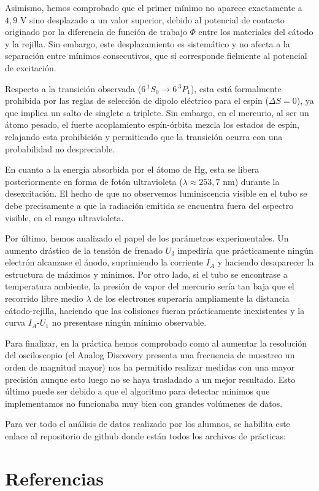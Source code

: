 \documentclass[11pt, a4paper, twocolumn]{article}
\begin{document}
Asimismo, hemos comprobado que el primer mínimo no aparece exactamente a 
$4{,}9$ V sino desplazado a un valor superior, debido al potencial de 
contacto originado por la diferencia de función de trabajo $\Phi$ entre 
los materiales del cátodo y la rejilla. Sin embargo, este desplazamiento 
es sistemático y no afecta a la separación entre mínimos consecutivos, 
que sí corresponde fielmente al potencial de excitación.

Respecto a la transición observada ($6\,^1S_0 \rightarrow 6\,^3P_1$), 
esta está formalmente prohibida por las reglas de selección de dipolo 
eléctrico para el espín ($\Delta S = 0$), ya que implica un salto de 
singlete a triplete. Sin embargo, en el mercurio, al ser un átomo pesado, 
el fuerte acoplamiento espín-órbita mezcla los estados de espín, relajando 
esta prohibición y permitiendo que la transición ocurra con una probabilidad 
no despreciable.

En cuanto a la energía absorbida por el átomo de Hg, esta se libera 
posteriormente en forma de fotón ultravioleta ($\lambda \approx 253{,}7$ nm) 
durante la desexcitación. El hecho de que no observemos luminiscencia visible 
en el tubo se debe precisamente a que la radiación emitida se encuentra fuera 
del espectro visible, en el rango ultravioleta.

Por último, hemos analizado el papel de los parámetros experimentales. Un 
aumento drástico de la tensión de frenado $U_3$ impediría que prácticamente 
ningún electrón alcanzase el ánodo, suprimiendo la corriente $I_A$ y haciendo 
desaparecer la estructura de máximos y mínimos. Por otro lado, si el tubo 
se encontrase a temperatura ambiente, la presión de vapor del mercurio sería 
tan baja que el recorrido libre medio $\lambda$ de los electrones superaría 
ampliamente la distancia cátodo-rejilla, haciendo que las colisiones fueran 
prácticamente inexistentes y la curva $I_A$-$U_1$ no presentase ningún 
mínimo observable.

\vspace{0.2cm}

Para finalizar, en la práctica hemos comprobado como al aumentar la resolución 
del osciloscopio (el Analog Discovery presenta una frecuencia de muestreo un orden 
de magnitud mayor) nos ha permitido realizar medidas con una mayor precisión aunque 
esto luego no se haya trasladado a un mejor resultado. Esto último puede ser debido a 
que el algoritmo para detectar minimos que implementamos no funcionaba muy bien con 
grandes volúmenes de datos.

\vspace{0.2cm}

Para ver todo el análisis de datos realizado por los alumnos, se habilita este 
enlace al repositorio de 
github donde están todos los archivos de prácticas: 
\cite{experimental32026}


\section{Referencias}

\nocite{experimental32026}


\printbibliography
\end{document}
